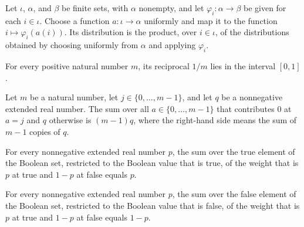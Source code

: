 \begin{theorem}
\label{FABL.map_uniformFunctionPMF_eq_independentProductPMF}
\leanok
{}
Let $\iota$, $\alpha$, and $\beta$ be finite sets, with $\alpha$ nonempty, and let
$\varphi_i:\alpha\to\beta$ be given for each $i\in\iota$. Choose a function
$a:\iota\to\alpha$ uniformly and map it to the function $i\mapsto\varphi_i(a(i))$.
Its distribution is the product, over $i\in\iota$, of the distributions obtained by
choosing uniformly from $\alpha$ and applying $\varphi_i$.
\end{theorem}

\begin{theorem}
\label{FABL.inverseDimension_mem_Icc}
\leanok
{}
For every positive natural number $m$, its reciprocal $1/m$ lies in the interval
$[0,1]$.
\end{theorem}

\begin{theorem}
\label{FABL.sum_fin_ite_ne}
\leanok
{}
Let $m$ be a natural number, let $j\in\{0,\ldots,m-1\}$, and let $q$ be a nonnegative
extended real number. The sum over all $a\in\{0,\ldots,m-1\}$ that contributes $0$ at
$a=j$ and $q$ otherwise is $(m-1)q$, where the right-hand side means the sum of $m-1$
copies of $q$.
\end{theorem}

\begin{theorem}
\label{FABL.sum_bool_filter_true}
\leanok
{}
For every nonnegative extended real number $p$, the sum over the true element of the
Boolean set, restricted to the Boolean value that is true, of the weight that is $p$ at
true and $1-p$ at false equals $p$.
\end{theorem}

\begin{theorem}
\label{FABL.sum_bool_filter_false}
\leanok
{}
For every nonnegative extended real number $p$, the sum over the false element of the
Boolean set, restricted to the Boolean value that is false, of the weight that is $p$ at
true and $1-p$ at false equals $1-p$.
\end{theorem}

